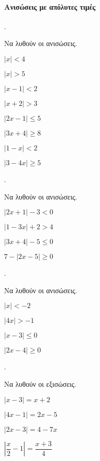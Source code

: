 \documentclass[11pt,a4paper,twocolumn]{article}
\newcounter{askhsh}
\newcommand{\askhsh}{\large\theaskhsh.\ \addtocounter{askhsh}{1}}
\begin{document}
\paragraph{Ανισώσεις με απόλυτες τιμές}
\askhsh Να λυθούν οι ανισώσεις.
\begin{multicols}{2}
\begin{alist}
\item $ \left|x\right|<4 $
\item $ \left|x\right|>5 $
\item $ \left|x-1\right|<2 $
\item $ \left|x+2\right|>3 $
\item $ \left|2x-1\right|\leq5 $
\item $ \left|3x+4\right|\geq8 $
\item $ \left|1-x\right|<2 $
\item $ \left|3-4x\right|\geq5 $
\end{alist}
\end{multicols}
\askhsh Να λυθούν οι ανισώσεις.
\begin{multicols}{2}
\begin{alist}
\item $ \left|2x+1\right|-3<0 $
\item $ \left|1-3x\right|+2>4 $
\item $ \left|3x+4\right|-5\leq0 $
\item $ 7-\left|2x-5\right|\geq0 $
\end{alist}
\end{multicols}
\askhsh Να λυθούν οι ανισώσεις.
\begin{multicols}{2}
\begin{alist}
\item $ \left|x\right|<-2 $
\item $ \left|4x\right|>-1 $
\item $ \left|x-3\right|\leq0 $
\item $ \left|2x-4\right|\geq0 $
\end{alist}
\end{multicols}
\askhsh Να λυθούν οι εξισώσεις.
\begin{multicols}{2}
\begin{alist}
\item $ \left|x-3\right|=x+2 $
\item $ \left|4x-1\right|=2x-5 $
\item $ \left|2x-3\right|=4-7x $
\item $ \left|\dfrac{x}{2}-1\right|=\dfrac{x+3}{4} $
\end{alist}
\end{multicols}
\end{document}

